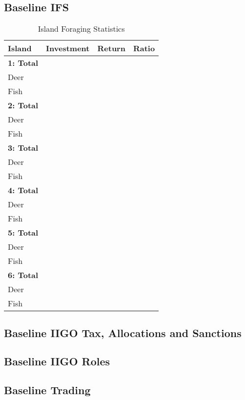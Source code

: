 \subsection{Baseline IFS}
\label{subsec:Simulations:baseline:ifs}
\begin{table}[htb]
    \centering
        \begin{tabular}{|l|l|l|l|}
        \hline
        Island            & Investment & Return & Ratio \\ \hline
        \textbf{1: Total} &            &        &       \\
        Deer              &            &        &       \\
        Fish              &            &        &       \\ \hline
        \textbf{2: Total} &            &        &       \\
        Deer              &            &        &       \\
        Fish              &            &        &       \\ \hline
        \textbf{3: Total} &            &        &       \\
        Deer              &            &        &       \\
        Fish              &            &        &       \\ \hline
        \textbf{4: Total} &            &        &       \\
        Deer              &            &        &       \\
        Fish              &            &        &       \\ \hline
        \textbf{5: Total} &            &        &       \\
        Deer              &            &        &       \\
        Fish              &            &        &       \\ \hline
        \textbf{6: Total} &            &        &       \\
        Deer              &            &        &       \\
        Fish              &            &        &       \\ \hline
\end{tabular}
\caption{Island Foraging Statistics}
\end{table}


\subsection{Baseline IIGO Tax, Allocations and Sanctions}
\label{subsec:Simulations:baseline:IIGO}


\subsection{Baseline IIGO Roles}
\label{subsec:Simulations:baseline:IIGO_roles}

\subsection{Baseline Trading}
\label{subsec:Simulations:baseline:trading}
